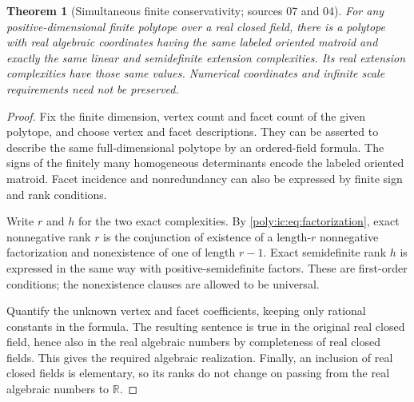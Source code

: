 \documentclass[11pt,a4paper]{article}
\numberwithin{equation}{section}
\newtheorem{theorem}{Theorem}[section]
\theoremstyle{plain}
\newcommand{\R}{\mathbb R}
\begin{document}
\begin{theorem}[Simultaneous finite conservativity; sources 07 and 04]\label{poly:ic:thm:conservativity}\label{poly:bao:thm:algebraicrealization}
For any positive-dimensional finite polytope over a real closed field,
there is a polytope with real algebraic coordinates having the same
labeled oriented matroid and exactly the same linear and semidefinite
extension complexities. Its real extension complexities have those same
values. Numerical coordinates and infinite scale requirements need not
be preserved.
\end{theorem}
\begin{proof}
Fix the finite dimension, vertex count and facet count of the given
polytope, and choose vertex and facet descriptions. They can be asserted
to describe the same full-dimensional polytope by an ordered-field
formula. The signs of the finitely many homogeneous determinants encode
the labeled oriented matroid. Facet incidence and nonredundancy can also
be expressed by finite sign and rank conditions.

Write $r$ and $h$ for the two exact complexities. By
\eqref{poly:ic:eq:factorization}, exact nonnegative rank $r$ is the conjunction
of existence of a length-$r$ nonnegative factorization and nonexistence
of one of length $r-1$. Exact semidefinite rank $h$ is expressed in the
same way with positive-semidefinite factors. These are first-order
conditions; the nonexistence clauses are allowed to be universal.

Quantify the unknown vertex and facet coefficients, keeping only rational
constants in the formula. The resulting sentence is true in the original
real closed field, hence also in the real algebraic numbers by completeness
of real closed fields. This gives the required algebraic realization.
Finally, an inclusion of real closed fields is elementary, so its ranks
do not change on passing from the real algebraic numbers to $\R$.
\end{proof}
\end{document}

